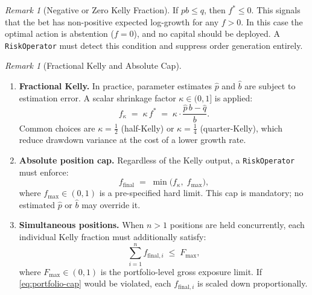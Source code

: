\documentclass[12pt,openany]{book}
\numberwithin{equation}{chapter}
\theoremstyle{plain}
\theoremstyle{definition}
\theoremstyle{remark}
\newtheorem{remark}[theorem]{Remark}
\numberwithin{equation}{chapter}
\theoremstyle{plain}
\begin{document}
\begin{remark}[Negative or Zero Kelly Fraction]
\label{rem:negative-kelly}
If $pb \leq q$, then $f^{*} \leq 0$.  This signals that the bet has
non-positive expected log-growth for any $f > 0$.  In this case the
optimal action is abstention ($f = 0$), and no capital should be
deployed.  A \texttt{RiskOperator} must detect this condition and
suppress order generation entirely.
\end{remark}

\begin{remark}[Fractional Kelly and Absolute Cap]
\label{rem:fractional-kelly}
\begin{enumerate}[label=(\roman*)]
  \item \textbf{Fractional Kelly.}
        In practice, parameter estimates $\hat{p}$ and $\hat{b}$ are
        subject to estimation error.  A scalar shrinkage factor
        $\kappa \in (0, 1]$ is applied:
        \begin{equation}
          f_{\kappa} \;=\; \kappa\, f^{*}
                      \;=\; \kappa \cdot \frac{\hat{p}\,b - \hat{q}}{b}.
          \label{eq:fractional-kelly}
        \end{equation}
        Common choices are $\kappa = \tfrac{1}{2}$ (half-Kelly) or
        $\kappa = \tfrac{1}{4}$ (quarter-Kelly), which reduce
        drawdown variance at the cost of a lower growth rate.

  \item \textbf{Absolute position cap.}
        Regardless of the Kelly output, a \texttt{RiskOperator} must
        enforce:
        \begin{equation}
          f_{\text{final}}
            \;=\; \min\!\bigl(f_{\kappa},\; f_{\max}\bigr),
          \label{eq:kelly-cap}
        \end{equation}
        where $f_{\max} \in (0, 1)$ is a pre-specified hard limit.
        This cap is mandatory; no estimated $\hat{p}$ or $\hat{b}$
        may override it.

  \item \textbf{Simultaneous positions.}
        When $n > 1$ positions are held concurrently, each individual
        Kelly fraction must additionally satisfy:
        \begin{equation}
          \sum_{i=1}^{n} f_{\text{final},i} \;\leq\; F_{\max},
          \label{eq:portfolio-cap}
        \end{equation}
        where $F_{\max} \in (0, 1)$ is the portfolio-level gross
        exposure limit.  If \eqref{eq:portfolio-cap} would be
        violated, each $f_{\text{final},i}$ is scaled down
        proportionally.
\end{enumerate}
\end{remark}
\end{document}
